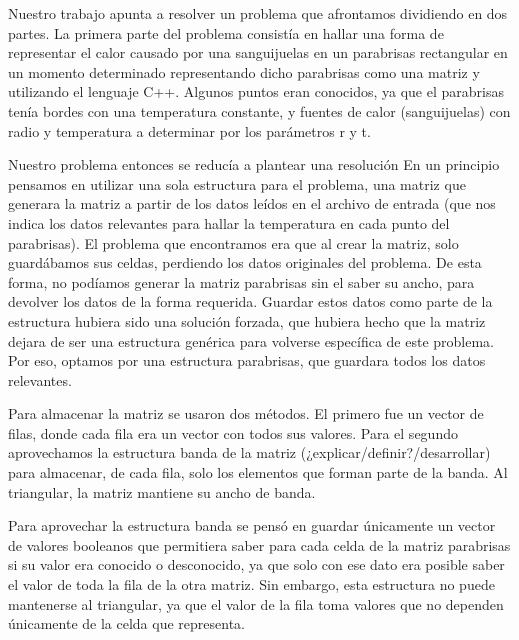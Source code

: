 \documentclass[spanish,a4paper]{article}
\begin{document}
Nuestro trabajo apunta a resolver un problema que afrontamos dividiendo en dos partes. La primera parte del problema consistía en hallar una forma de representar el calor causado por una sanguijuelas en un parabrisas rectangular en un momento determinado representando dicho parabrisas como una matriz y utilizando el lenguaje C++. Algunos puntos eran conocidos, ya que el parabrisas tenía bordes con una temperatura constante, y fuentes de calor (sanguijuelas) con radio y temperatura a determinar por los parámetros r y t.

Nuestro problema entonces se reducía a plantear una resolución
En un principio pensamos en utilizar una sola estructura para el problema, una matriz que generara la matriz a partir de los datos leídos en el archivo de entrada (que nos indica los datos relevantes para hallar la temperatura en cada punto del parabrisas). El problema que encontramos era que al crear la matriz, solo guardábamos sus celdas, perdiendo los datos originales del problema. De esta forma, no podíamos generar la matriz parabrisas sin el saber su ancho, para devolver los datos de la forma requerida. Guardar estos datos como parte de la estructura hubiera sido una solución forzada, que hubiera hecho que la matriz dejara de ser una estructura genérica para volverse específica de este problema. Por eso, optamos por una estructura parabrisas, que guardara todos los datos relevantes. %








Para almacenar la matriz se usaron dos métodos. El primero fue un vector de filas, donde cada fila era un vector con todos sus valores. Para el segundo aprovechamos la estructura banda de la matriz (¿explicar/definir?/desarrollar) para almacenar, de cada fila, solo los elementos que forman parte de la banda. Al triangular, la matriz mantiene su ancho de banda.










Para aprovechar la estructura banda se pensó en guardar únicamente un vector de valores booleanos %
que permitiera saber para cada celda de la matriz parabrisas si su valor era conocido o desconocido, ya que solo con ese dato era posible saber el valor de toda la fila de la otra matriz. Sin embargo, esta estructura no puede mantenerse al triangular, ya que el valor de la fila toma valores que no dependen únicamente de la celda que representa. %
\end{document}
